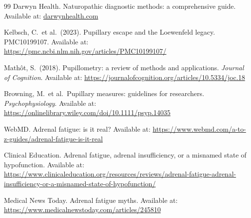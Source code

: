 \documentclass[11pt]{article}
\begin{document}
\begin{thebibliography}{99}
 Darwyn Health. Naturopathic diagnostic methods: a
  comprehensive guide. Available at:
  \href{https://www.darwynhealth.com/alternative-medicine/naturopathy/principles-of-naturopathy/naturopathic-diagnostic-methods/a-comprehensive-guide-to-naturopathic-diagnostic-methods-for-improved-wellness/}{darwynhealth.com}

 Kelbsch, C.\ et al.\ (2023). Pupillary escape and the
  Loewenfeld legacy. PMC10199107. Available at:
  \url{https://pmc.ncbi.nlm.nih.gov/articles/PMC10199107/}

 Math\^ot, S.\ (2018). Pupillometry: a review of methods
  and applications. \textit{Journal of Cognition}. Available at:
  \url{https://journalofcognition.org/articles/10.5334/joc.18}

 Browning, M.\ et al.\ Pupillary measures: guidelines
  for researchers. \textit{Psychophysiology}. Available at:
  \url{https://onlinelibrary.wiley.com/doi/10.1111/psyp.14035}

 WebMD. Adrenal fatigue: is it real? Available at:
  \url{https://www.webmd.com/a-to-z-guides/adrenal-fatigue-is-it-real}

 Clinical Education. Adrenal fatigue, adrenal
  insufficiency, or a misnamed state of hypofunction. Available at:
  \url{https://www.clinicaleducation.org/resources/reviews/adrenal-fatigue-adrenal-insufficiency-or-a-misnamed-state-of-hypofunction/}

 Medical News Today. Adrenal fatigue myths. Available at:
  \url{https://www.medicalnewstoday.com/articles/245810}

\end{thebibliography}
\endgroup
\end{document}

